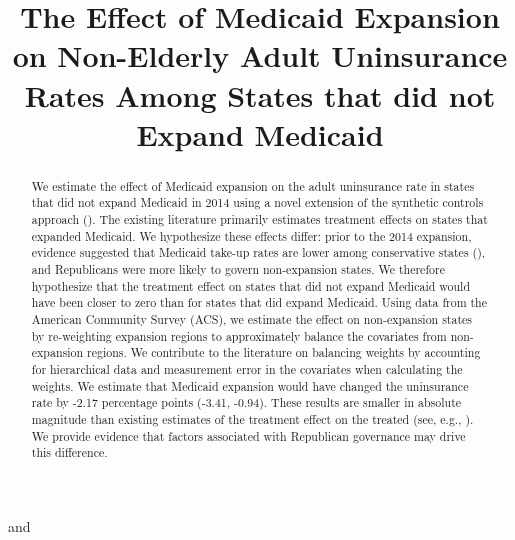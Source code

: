 \documentclass[aoas]{imsart}
\theoremstyle{plain}
\theoremstyle{remark}
\begin{document}
\begin{frontmatter}
\title{The Effect of Medicaid Expansion on Non-Elderly Adult Uninsurance Rates Among States that did not Expand Medicaid}
\runtitle{}

\begin{aug}
\author[A]{ } and
\author[A]{ }
\address[A]{Carnegie Mellon University, }

\end{aug}

\begin{abstract}
We estimate the effect of Medicaid expansion on the adult uninsurance rate in states that did not expand Medicaid in 2014 using a novel extension of the synthetic controls approach (\cite{abadie2010synthetic}). The existing literature primarily estimates treatment effects on states that expanded Medicaid. We hypothesize these effects differ: prior to the 2014 expansion, evidence suggested that Medicaid take-up rates are lower among conservative states (\cite{sommers2012understanding}), and Republicans were more likely to govern non-expansion states. We therefore hypothesize that the treatment effect on states that did not expand Medicaid would have been closer to zero than for states that did expand Medicaid. Using data from the American Community Survey (ACS), we estimate the effect on non-expansion states by re-weighting expansion regions to approximately balance the covariates from non-expansion regions. We contribute to the literature on balancing weights by accounting for hierarchical data and measurement error in the covariates when calculating the weights. We estimate that Medicaid expansion would have changed the uninsurance rate by -2.17 percentage points (-3.41, -0.94). These results are smaller in absolute magnitude than existing estimates of the treatment effect on the treated (see, e.g., \cite{courtemanche2017early}). We provide evidence that factors associated with Republican governance may drive this difference.
\end{abstract}


\end{frontmatter}
\end{document}
